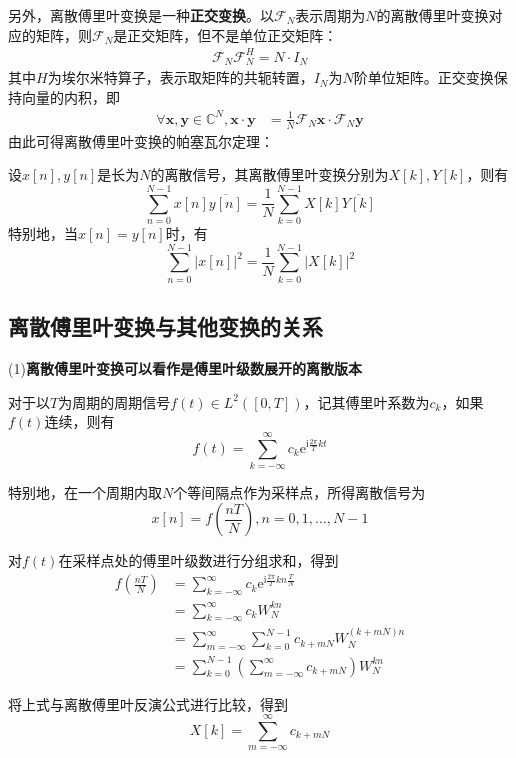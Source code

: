 另外，离散傅里叶变换是一种\textbf{正交变换}。以$\mathcal{F} _N$表示周期为$N$的离散傅里叶变换对应的矩阵，则$\mathcal{F} _N$是正交矩阵，但不是单位正交矩阵：
\begin{align*}
\mathcal{F}_N \mathcal{F}_N^H = N\cdot I_N
\end{align*}
其中$H$为埃尔米特算子，表示取矩阵的共轭转置，$I_N$为$N$阶单位矩阵。正交变换保持向量的内积，即
\begin{align*}
    \forall \mathbf{x,y}\in\mathbb{C}^N,\mathbf{x}\cdot\mathbf{y}&=\frac{1}{N}\mathcal{F} _N \mathbf{x}\cdot\mathcal{F} _N \mathbf{y}
\end{align*}
由此可得离散傅里叶变换的帕塞瓦尔定理：
\begin{theorem}[离散傅里叶变换的帕塞瓦尔定理]
    设$x[n],y[n]$是长为$N$的离散信号，其离散傅里叶变换分别为$X[k],Y[k]$，则有
    \[\sum_{n=0}^{N-1}x[n]\overline{y[n]}=\frac{1}{N}\sum_{k=0}^{N-1}X[k]\overline{Y[k]}\]
    特别地，当$x[n]=y[n]$时，有
    \[\sum_{n=0}^{N-1}|x[n]|^2=\frac{1}{N}\sum_{k=0}^{N-1}|X[k]|^2\]
\end{theorem}

\subsection{离散傅里叶变换与其他变换的关系}\label{sub:relation_of_dft}

(1)\textbf{离散傅里叶变换可以看作是傅里叶级数展开的离散版本}

对于以$T$为周期的周期信号$f(t)\in L^2([0,T])$，记其傅里叶系数为$c_k$，如果$f(t)$连续，则有
\[f(t)=\sum_{k=-\infty}^{\infty}c_k \mathrm{e}^{\mathrm{i}\frac{2\pi}{T}kt}\]

特别地，在一个周期内取$N$个等间隔点作为采样点，所得离散信号为
\[x[n]=f\left(\frac{nT}{N}\right),n=0,1,\dots,N-1\]

对$f(t)$在采样点处的傅里叶级数进行分组求和，得到
\begin{align*}
    f\left(\frac{nT}{N}\right)&=\sum_{k=-\infty}^{\infty}c_k \mathrm{e}^{\mathrm{i}\frac{2\pi}{T}kn\frac{T}{N}}\\
    &=\sum_{k=-\infty}^{\infty}c_k W_N^{kn}\\
    &=\sum_{m=-\infty}^{\infty}\sum_{k=0}^{N-1}c_{k+mN} W_N^{(k+mN)n}\\
    &=\sum_{k=0}^{N-1}\left(\sum_{m=-\infty}^{\infty}c_{k+mN}\right)W_N^{kn}
\end{align*}

将上式与离散傅里叶反演公式进行比较，得到
\[X[k]=\sum_{m=-\infty}^{\infty}c_{k+mN}\]

